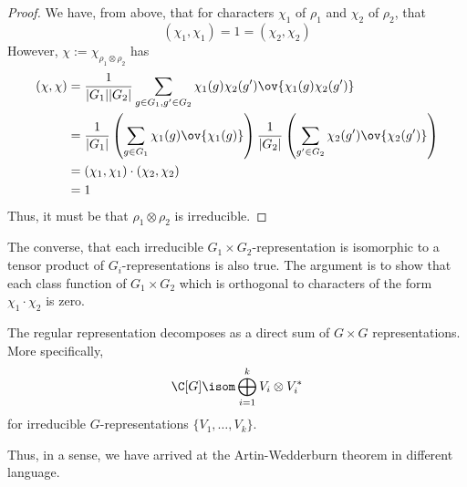 \documentclass[11pt,leqno,oneside]{amsbook}
\numberwithin{thm}{section}
\begin{document}
\begin{proof}
  We have, from above, that for characters \(\chi_1\) of \(\rho_1\)
  and \(\chi_2\) of \(\rho_2\), that \[
    (\chi_1, \chi_1) = 1 = (\chi_2,\chi_2)
  \]
  However, \(\chi := \chi_{\rho_1 \otimes \rho_2}\) has
  \begin{align*}
    (\chi,\chi) & = 
    \frac{1}{|G_1||G_2|} \sum_{g \in G_1, g' \in G_2} \chi_1(g)
                  \chi_2(g') \ov{\chi_1(g) \chi_2(g')} \\
    & = \frac{1}{|G_1|} \left(
      \sum_{g \in G_1} \chi_1(g) \ov{\chi_1(g)} \right)
      \frac{1}{|G_2|} \left( 
      \sum_{g' \in G_2} \chi_2(g') \ov{\chi_2(g')} \right) \\
    & = (\chi_1, \chi_1) \cdot (\chi_2, \chi_2) \\
    & = 1
  \end{align*}
  Thus, it must be that \(\rho_1 \otimes \rho_2\) is irreducible.
\end{proof}
\begin{rmk}
  The converse, that each irreducible \(G_1 \times
  G_2\)-representation is isomorphic to a tensor product of
  \(G_i\)-representations is also true. The argument is to show that
  each class function of \(G_1 \times G_2\) which is orthogonal to
  characters of the form \(\chi_1 \cdot \chi_2\) is zero.
\end{rmk}
\begin{thm}
  The regular representation decomposes as a direct sum of \(G \times
  G\) representations. More specifically, \[
    \C[G] \isom \bigoplus_{i=1}^k V_i \otimes V_i^*
  \]
  for irreducible \(G\)-representations \(\{V_1, \ldots, V_k\}\).
\end{thm}
\begin{rmk}
  Thus, in a sense, we have arrived at the Artin-Wedderburn theorem in
  different language. 
\end{rmk}
\end{document}
